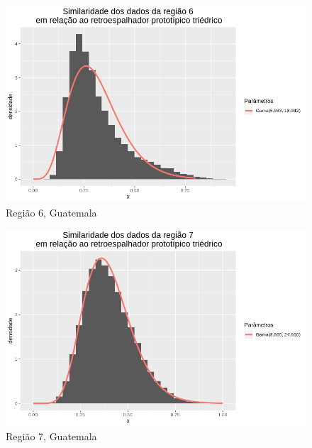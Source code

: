 \documentclass[12pt]{article}
\begin{document}
\begin{figure}[!h]
    \centering
    \includegraphics[width = 0.95\linewidth]{../../Images/Report_18_12_17/tri_region6.png}
    \caption{Região 6, Guatemala}
    \label{fig:tri_r6}
\end{figure}

\begin{figure}[!h]
    \centering
    \vspace{0.1\linewidth}
    \includegraphics[width = 0.95\linewidth]{../../Images/Report_18_12_17/tri_region7.png}
    \caption{Região 7, Guatemala}
    \label{fig:tri_r7}
\end{figure}
\end{document}
